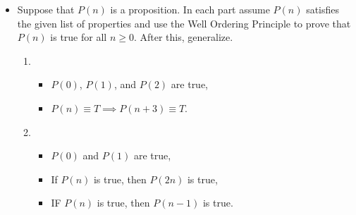 \begin{itemize}
\item Suppose that $P(n)$ is a proposition. In each part assume $P(n)$ satisfies the given list of properties and use the Well Ordering Principle to prove that $P(n)$ is true for all $n \geq 0$. After this, generalize.
	\begin{enumerate}
		\item 
		\begin{itemize}
			\item $P(0)$, $P(1)$, and $P(2)$ are true,
			\item $P(n) \equiv T \implies P(n + 3) \equiv T$.
		\end{itemize}
		\item
		\begin{itemize}
			\item $P(0)$ and $P(1)$ are true,
			\item If $P(n)$ is true, then $P(2n)$ is true,
			\item IF $P(n)$ is true, then $P(n - 1)$ is true.
		\end{itemize}
	\end{enumerate}
\end{itemize}